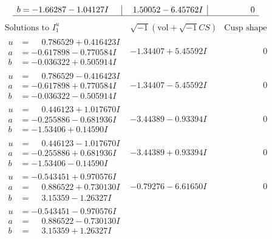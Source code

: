 \documentclass[1p]{elsarticle_modified}
\theoremstyle{definition}
\newcommand{\I}{\sqrt{-1}}
\begin{document}
$$\begin{array}{c|c|c}
\begin{aligned}
b &= -1.66287 - 1.04127 I\end{aligned}
 & \phantom{-}1.50052 - 6.45762 I & \phantom{-0.000000 } 0\\
 \hline 
 \end{array}$$\newpage$$\begin{array}{c|c|c}  
\text{Solutions to }I^u_{1}& \I (\text{vol} + \sqrt{-1}CS) & \text{Cusp shape}\\
 \hline 
\begin{aligned}
u &= \phantom{-}0.786529 + 0.416423 I \\
a &= -0.617898 - 0.770584 I \\
b &= -0.036322 + 0.505914 I\end{aligned}
 & -1.34407 + 5.45592 I & \phantom{-0.000000 } 0 \\ \hline\begin{aligned}
u &= \phantom{-}0.786529 - 0.416423 I \\
a &= -0.617898 + 0.770584 I \\
b &= -0.036322 - 0.505914 I\end{aligned}
 & -1.34407 - 5.45592 I & \phantom{-0.000000 } 0 \\ \hline\begin{aligned}
u &= \phantom{-}0.446123 + 1.017670 I \\
a &= -0.255886 - 0.681936 I \\
b &= -1.53406 + 0.14590 I\end{aligned}
 & -3.44389 - 0.93394 I & \phantom{-0.000000 } 0 \\ \hline\begin{aligned}
u &= \phantom{-}0.446123 - 1.017670 I \\
a &= -0.255886 + 0.681936 I \\
b &= -1.53406 - 0.14590 I\end{aligned}
 & -3.44389 + 0.93394 I & \phantom{-0.000000 } 0 \\ \hline\begin{aligned}
u &= -0.543451 + 0.970576 I \\
a &= \phantom{-}0.886522 + 0.730130 I \\
b &= \phantom{-}3.15359 - 1.26327 I\end{aligned}
 & -0.79276 - 6.61650 I & \phantom{-0.000000 } 0 \\ \hline\begin{aligned}
u &= -0.543451 - 0.970576 I \\
a &= \phantom{-}0.886522 - 0.730130 I \\
b &= \phantom{-}3.15359 + 1.26327 I\end{aligned}

\end{array}$$
\end{document}
